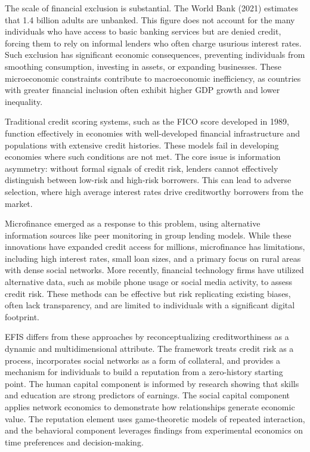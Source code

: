 \documentclass{article}
\begin{document}
The scale of financial exclusion is substantial. The World Bank (2021) estimates that 1.4 billion adults are unbanked. This figure does not account for the many individuals who have access to basic banking services but are denied credit, forcing them to rely on informal lenders who often charge usurious interest rates. Such exclusion has significant economic consequences, preventing individuals from smoothing consumption, investing in assets, or expanding businesses. These microeconomic constraints contribute to macroeconomic inefficiency, as countries with greater financial inclusion often exhibit higher GDP growth and lower inequality.

Traditional credit scoring systems, such as the FICO score developed in 1989, function effectively in economies with well-developed financial infrastructure and populations with extensive credit histories. These models fail in developing economies where such conditions are not met. The core issue is information asymmetry: without formal signals of credit risk, lenders cannot effectively distinguish between low-risk and high-risk borrowers. This can lead to adverse selection, where high average interest rates drive creditworthy borrowers from the market.

Microfinance emerged as a response to this problem, using alternative information sources like peer monitoring in group lending models. While these innovations have expanded credit access for millions, microfinance has limitations, including high interest rates, small loan sizes, and a primary focus on rural areas with dense social networks. More recently, financial technology firms have utilized alternative data, such as mobile phone usage or social media activity, to assess credit risk. These methods can be effective but risk replicating existing biases, often lack transparency, and are limited to individuals with a significant digital footprint.

EFIS differs from these approaches by reconceptualizing creditworthiness as a dynamic and multidimensional attribute. The framework treats credit risk as a process, incorporates social networks as a form of collateral, and provides a mechanism for individuals to build a reputation from a zero-history starting point. The human capital component is informed by research showing that skills and education are strong predictors of earnings. The social capital component applies network economics to demonstrate how relationships generate economic value. The reputation element uses game-theoretic models of repeated interaction, and the behavioral component leverages findings from experimental economics on time preferences and decision-making.
\end{document}
